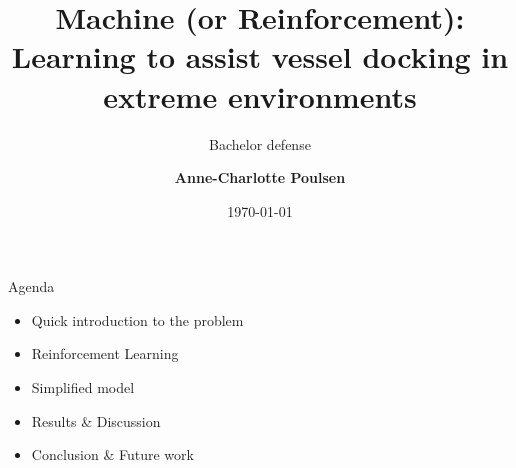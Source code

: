 \documentclass{beamer}
\title{Machine (or Reinforcement): Learning to assist vessel docking in extreme environments}
\subtitle{Bachelor defense}
\date{\today }
\author{
  \textbf{Anne-Charlotte Poulsen}
}
\institute[
  SDU Robotics\\
  The Maersk Mc-Kinney Moller Institute\\
  University of Southern Denmark
] %
{%
  SDU Robotics\\
  The Maersk Mc-Kinney Moller Institute\\
  University of Southern Denmark

}
\begin{document}
{\SDUwavesbg%
\begin{frame} %
  \titlepage
\end{frame}}

\begin{frame}{Agenda}{\vphantom{(y}}
  \begin{itemize}
    \item Quick introduction to the problem
    \item Reinforcement Learning
    \item Simplified model
    \item Results \& Discussion
    \item Conclusion \& Future work
  \end{itemize}
\end{frame}
\end{document}
